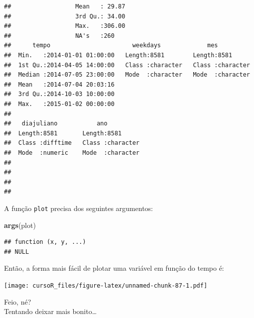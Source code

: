 \documentclass[]{book}
\newenvironment{Shaded}{\begin{snugshade}}{\end{snugshade}}
\newcommand{\KeywordTok}[1]{\textcolor[rgb]{0.13,0.29,0.53}{\textbf{#1}}}
\newcommand{\DataTypeTok}[1]{\textcolor[rgb]{0.13,0.29,0.53}{#1}}
\newcommand{\OperatorTok}[1]{\textcolor[rgb]{0.81,0.36,0.00}{\textbf{#1}}}
\newcommand{\NormalTok}[1]{#1}
\theoremstyle{definition}
\theoremstyle{definition}
\theoremstyle{definition}
\theoremstyle{remark}
\begin{document}
\begin{verbatim}
##                  Mean   : 29.87                                           
##                  3rd Qu.: 34.00                                           
##                  Max.   :306.00                                           
##                  NA's   :260                                              
##      tempo                       weekdays             mes           
##  Min.   :2014-01-01 01:00:00   Length:8581        Length:8581       
##  1st Qu.:2014-04-05 14:00:00   Class :character   Class :character  
##  Median :2014-07-05 23:00:00   Mode  :character   Mode  :character  
##  Mean   :2014-07-04 20:03:16                                        
##  3rd Qu.:2014-10-03 10:00:00                                        
##  Max.   :2015-01-02 00:00:00                                        
##                                                                     
##   diajuliano           ano           
##  Length:8581       Length:8581       
##  Class :difftime   Class :character  
##  Mode  :numeric    Mode  :character  
##                                      
##                                      
##                                      
## 
\end{verbatim}

A função \texttt{plot} precisa dos seguintes argumentos:

\begin{Shaded}
\begin{Highlighting}[]
\KeywordTok{args}\NormalTok{(plot)}
\end{Highlighting}
\end{Shaded}

\begin{verbatim}
## function (x, y, ...) 
## NULL
\end{verbatim}

Então, a forma mais fácil de plotar uma variável em função do tempo é:

\begin{Shaded}
\end{Shaded}

\texttt{[image: cursoR\_files/figure-latex/unnamed-chunk-87-1.pdf]}

Feio, né?\\
Tentando deixar mais bonito\ldots{}
\end{document}
